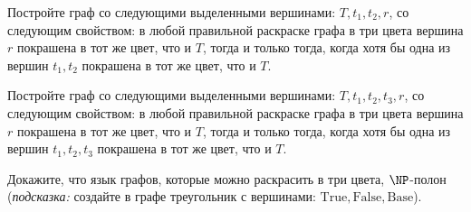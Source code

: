 \begin{enumcyr}
    \item Постройте граф со следующими выделенными вершинами: $T, t_1, t_2, r$, со следующим
        свойством: в любой правильной раскраске графа в три цвета вершина $r$ покрашена в тот же цвет,
        что и $T$, тогда и только тогда, когда хотя бы одна из вершин $t_1, t_2$ покрашена в тот же цвет,
        что и $T$.
    \item Постройте граф со следующими выделенными вершинами: $T, t_1, t_2, t_3, r$, со следующим
        свойством: в любой правильной раскраске графа в три цвета вершина $r$ покрашена в тот же цвет,
        что и $T$, тогда и только тогда, когда хотя бы одна из вершин $t_1, t_2, t_3$ покрашена в тот же
        цвет, что и $T$.
    \item Докажите, что язык графов, которые можно раскрасить в три цвета, $\NP$-полон
        (\textit{подсказка:} создайте в графе треугольник с вершинами: $\mathrm{True}, \mathrm{False},
        \mathrm{Base}$).
\end{enumcyr}